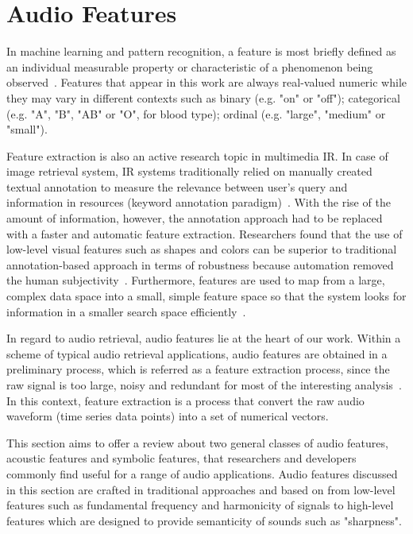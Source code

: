 \section{Audio Features} 
In machine learning and pattern recognition, a feature is most briefly defined as an individual measurable property or characteristic of a phenomenon being observed~\cite{bishop2006}. Features that appear in this work are always real-valued numeric while they may vary in different contexts such as binary (e.g. "on" or "off"); categorical (e.g. "A", "B", "AB" or "O", for blood type); ordinal (e.g. "large", "medium" or "small").

Feature extraction is also an active research topic in multimedia IR. In case of image retrieval system, IR systems traditionally relied on manually created textual annotation to measure the relevance between user's query and information in resources (keyword annotation paradigm)~\cite{yong1998}. With the rise of the amount of information, however, the annotation approach had to be replaced with a faster and automatic feature extraction. Researchers found that the use of low-level visual features such as shapes and colors can be superior to traditional annotation-based approach in terms of robustness because automation removed the human subjectivity~\cite{jalal2016}.
 Furthermore, features are used to map from a large, complex data space into a small, simple feature space so that the system looks for information in a smaller search space efficiently~\cite{dragos2000}. 

 In regard to audio retrieval, audio features lie at the heart of our work.  Within a scheme of typical audio retrieval applications, audio features are obtained in a preliminary process, which is referred as a feature extraction process, since the raw signal is too large, noisy and redundant for most of the interesting analysis~\cite{bello2016}. In this context, feature extraction is a process that convert the raw audio waveform (time series data points) into a set of numerical vectors.  

This section aims to offer a review about two general classes of audio features, acoustic features and symbolic features, that researchers and developers commonly find useful for a range of audio applications. Audio features discussed in this section are crafted in traditional approaches and based on from low-level features such as fundamental frequency and harmonicity of signals to high-level features which are designed to provide semanticity of sounds such as "sharpness". 

